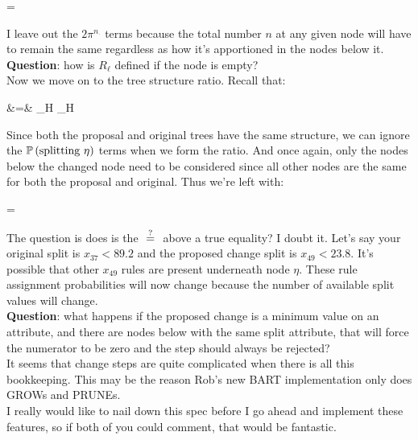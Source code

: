 \beqn
{} = 
\eeqn

I leave out the $2\pi^{n_\cdot}$ terms because the total number $n$ at any given node will have to remain the same regardless as how it's apportioned in the nodes below it. \\

\textbf{Question}: how is $R_\ell$ defined if the node is empty? \\

Now we move on to the tree structure ratio. Recall that:

\beqn
{} &=& \prod_{\eta \in H}  \prod_{\eta \in H}  \\
\eeqn

Since both the proposal and original trees have the same structure, we can ignore the $\mathbb{P}\left(\text{splitting~} \eta\right)$ terms when we form the ratio. And once again, only the nodes below the changed node need to be considered since all other nodes are the same for both the proposal and original. Thus we're left with:

\beqn
{} =  \equalsquestion {}
\eeqn

The question is does is the $\equalsquestion$ above a true equality? I doubt it. Let's say your original split is $x_{37} < 89.2$ and the proposed change split is $x_{49} < 23.8$. It's possible that other $x_{49}$ rules are present underneath node $\eta$. These rule assignment probabilities will now change because the number of available split values will change. \\

\textbf{Question}: what happens if the proposed change is a minimum value on an attribute, and there are nodes below with the same split attribute, that will force the numerator to be zero and the step should always be rejected? \\

It seems that change steps are quite complicated when there is all this bookkeeping. This may be the reason Rob's new BART implementation only does GROWs and PRUNEs. \\

I really would like to nail down this spec before I go ahead and implement these features, so if both of you could comment, that would be fantastic.








